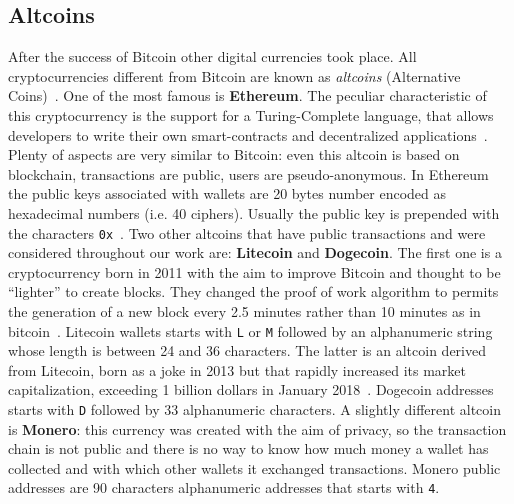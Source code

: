 \subsection{Altcoins}
After the success of Bitcoin other digital currencies took place.
All cryptocurrencies different from Bitcoin are known as 
\emph{altcoins} (Alternative Coins)~\cite{bib:bitcoinbeyond}.
One of the most famous is
\textbf{Ethereum}. The peculiar characteristic of this cryptocurrency is
the support for a Turing-Complete language, that allows developers to
write their own smart-contracts and decentralized
applications~\cite{bib:ethereum:whitepaper}.
Plenty of aspects are very similar to Bitcoin: even
this altcoin is based on blockchain, transactions are public, users are
pseudo-anonymous. In Ethereum the public keys associated with wallets are 20
bytes number encoded as hexadecimal numbers (i.e. 40 ciphers). Usually
the public key is prepended with the characters
\texttt{0x}~\cite{bib:ethereum:whitepaper}.
Two other altcoins that have public transactions and were considered
throughout our work are: \textbf{Litecoin} and \textbf{Dogecoin}.
The first one is a cryptocurrency born in 2011 with the aim to improve
Bitcoin and thought to be ``lighter'' to create blocks.
They changed the proof of work algorithm to permits the
generation of a new block every 2.5 minutes rather than 10 minutes as in
bitcoin~\cite{bib:litecoin:wiki}.
Litecoin wallets starts with \texttt{L} or \texttt{M} followed by an
alphanumeric string whose length is between 24 and 36 characters.
The latter is an altcoin derived from Litecoin, born as a joke in 2013
but that rapidly increased its market capitalization, exceeding 1
billion dollars in January 2018~\cite{bib:dogecoin:marketcap}.
Dogecoin addresses starts with \texttt{D} followed by 33 alphanumeric
characters. A slightly different altcoin is \textbf{Monero}: this currency was
created with the aim of privacy, so the transaction chain is not public
and there is no way to know how much money a wallet has collected and
with which other wallets it exchanged transactions.
Monero public addresses are 90 characters alphanumeric addresses that starts
with \texttt{4}.


